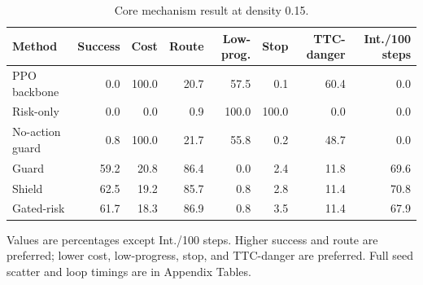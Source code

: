 
\begin{table}[t]
\centering
\caption{Core mechanism result at density 0.15.}
\label{tab_core_mechanism}
\scriptsize
\setlength{\tabcolsep}{3.4pt}
\renewcommand{\arraystretch}{1.08}
\begin{tabular}{@{}lrrrrrrr@{}}
\toprule
Method & Success & Cost & Route & Low-prog. & Stop & TTC-danger & Int./100 steps \\
\midrule
PPO backbone & 0.0 & 100.0 & 20.7 & 57.5 & 0.1 & 60.4 & 0.0 \\
Risk-only & 0.0 & 0.0 & 0.9 & 100.0 & 100.0 & 0.0 & 0.0 \\
No-action guard & 0.8 & 100.0 & 21.7 & 55.8 & 0.2 & 48.7 & 0.0 \\
Guard & 59.2 & 20.8 & 86.4 & 0.0 & 2.4 & 11.8 & 69.6 \\
Shield & 62.5 & 19.2 & 85.7 & 0.8 & 2.8 & 11.4 & 70.8 \\
Gated-risk & 61.7 & 18.3 & 86.9 & 0.8 & 3.5 & 11.4 & 67.9 \\
\bottomrule
\end{tabular}
\begin{tablenotes}
\item Values are percentages except Int./100 steps. Higher success and route are preferred; lower cost, low-progress, stop, and TTC-danger are preferred. Full seed scatter and loop timings are in Appendix Tables.
\end{tablenotes}
\end{table}
